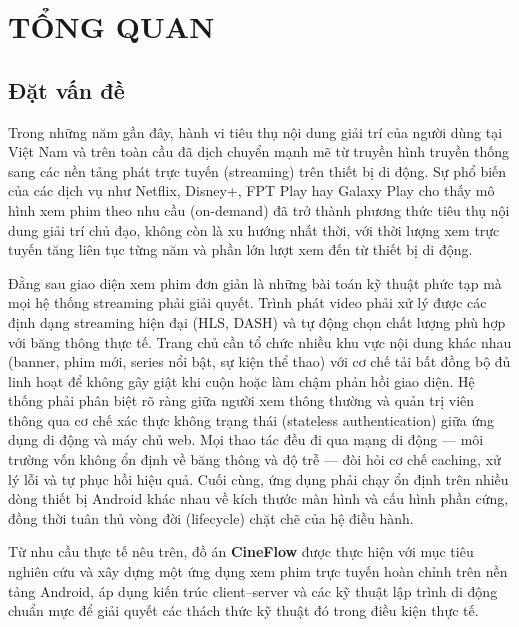 \chapter{TỔNG QUAN}
\label{chap:tong_quan}

\section{Đặt vấn đề}
\label{sec:dat_van_de}

Trong những năm gần đây, hành vi tiêu thụ nội dung giải trí của người dùng tại Việt Nam
và trên toàn cầu đã dịch chuyển mạnh mẽ từ truyền hình truyền thống sang các nền tảng phát
trực tuyến (streaming) trên thiết bị di động. Sự phổ biến của các dịch vụ như Netflix,
Disney+, FPT Play hay Galaxy Play cho thấy mô hình xem phim theo nhu cầu (on-demand) đã
trở thành phương thức tiêu thụ nội dung giải trí chủ đạo, không còn là xu hướng nhất
thời, với thời lượng xem trực tuyến tăng liên tục từng năm và phần lớn lượt xem đến từ
thiết bị di động.

Đằng sau giao diện xem phim đơn giản là những bài toán kỹ thuật phức tạp mà mọi hệ thống
streaming phải giải quyết. Trình phát video phải xử lý được các định dạng streaming hiện
đại (HLS, DASH) và tự động chọn chất lượng phù hợp với băng thông thực tế. Trang chủ cần
tổ chức nhiều khu vực nội dung khác nhau (banner, phim mới, series nổi bật, sự kiện thể
thao) với cơ chế tải bất đồng bộ đủ linh hoạt để không gây giật khi cuộn hoặc làm chậm
phản hồi giao diện. Hệ thống phải phân biệt rõ ràng giữa người xem thông thường và quản
trị viên thông qua cơ chế xác thực không trạng thái (stateless authentication) giữa ứng
dụng di động và máy chủ web. Mọi thao tác đều đi qua mạng di động — môi trường vốn không
ổn định về băng thông và độ trễ — đòi hỏi cơ chế caching, xử lý lỗi và tự phục hồi hiệu
quả. Cuối cùng, ứng dụng phải chạy ổn định trên nhiều dòng thiết bị Android khác nhau về
kích thước màn hình và cấu hình phần cứng, đồng thời tuân thủ vòng đời (lifecycle) chặt
chẽ của hệ điều hành.

Từ nhu cầu thực tế nêu trên, đồ án \textbf{CineFlow} được thực hiện với mục tiêu nghiên
cứu và xây dựng một ứng dụng xem phim trực tuyến hoàn chỉnh trên nền tảng Android, áp dụng
kiến trúc client--server và các kỹ thuật lập trình di động chuẩn mực để giải quyết các
thách thức kỹ thuật đó trong điều kiện thực tế.


